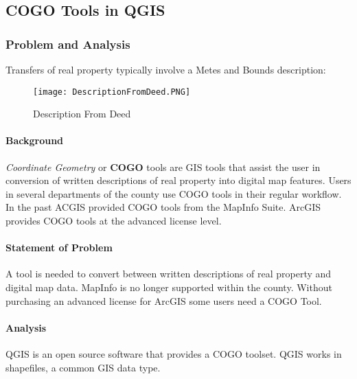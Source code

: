 %
%
%
%  

\subsection{COGO Tools in QGIS}
\subsubsection{Problem and Analysis}
Transfers of real property typically involve a Metes and Bounds description:
\begin{figure}[h!]
\centering
    \texttt{[image: DescriptionFromDeed.PNG]}
\vspace{-.2in}

\caption{Description From Deed}
\end{figure}
\begin{adjmulticols}{2}{\innerMar}{\outerMar}
\paragraph{Background}
\noindent\textit{Coordinate Geometry} or \textbf{COGO} tools are GIS tools that assist the user in conversion of written descriptions of real property into digital map features.  Users in several departments of the county use COGO tools in their regular workflow.  In the past ACGIS provided COGO tools from the MapInfo Suite.  ArcGIS provides COGO tools at the advanced license level.
\paragraph{Statement of Problem}
\noindent A tool is needed to convert between written descriptions of real property and digital map data.  MapInfo is no longer supported within the county.  Without purchasing an advanced license for ArcGIS some users need a COGO Tool.
\paragraph{Analysis}
\noindent QGIS is an open source software that provides a COGO toolset.  QGIS works in shapefiles, a common GIS data type.
\end{adjmulticols}
\clearpage
